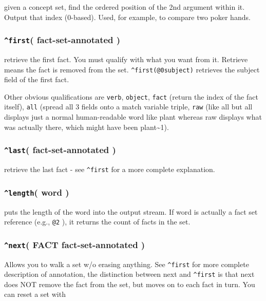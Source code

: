 \documentclass[]{article}
\begin{document}
given a concept set, find the ordered position of the 2nd argument
within it. Output that index (0-based). Used, for example, to compare
two poker hands.

\subsubsection{\texorpdfstring{\texttt{\^{}first}( fact-set-annotated
)}{\^{}first( fact-set-annotated )}}\label{first-fact-set-annotated}

retrieve the first fact. You must qualify with what you want from it.
Retrieve means the fact is removed from the set.
\texttt{\^{}first(@0subject)} retrieves the subject field of the first
fact.

Other obvious qualifications are \texttt{verb}, \texttt{object},
\texttt{fact} (return the index of the fact itself), \texttt{all}
(spread all 3 fields onto a match variable triple, \texttt{raw} (like
all but all displays just a normal human-readable word like plant
whereas raw displays what was actually there, which might have been
plant\textasciitilde{}1).

\subsubsection{\texorpdfstring{\texttt{\^{}last}( fact-set-annotated
)}{\^{}last( fact-set-annotated )}}\label{last-fact-set-annotated}

retrieve the last fact - see \texttt{\^{}first} for a more complete
explanation.

\subsubsection{\texorpdfstring{\texttt{\^{}length}( word
)}{\^{}length( word )}}\label{length-word}

puts the length of the word into the output stream. If word is actually
a fact set reference (e.g., \texttt{@2} ), it returns the count of facts
in the set.

\subsubsection{\texorpdfstring{\texttt{\^{}next}( FACT
fact-set-annotated
)}{\^{}next( FACT fact-set-annotated )}}\label{next-fact-fact-set-annotated}

Allows you to walk a set w/o erasing anything. See \texttt{\^{}first}
for more complete description of annotation, the distinction between
next and \texttt{\^{}first} is that next does NOT remove the fact from
the set, but moves on to each fact in turn. You can reset a set with
\end{document}
